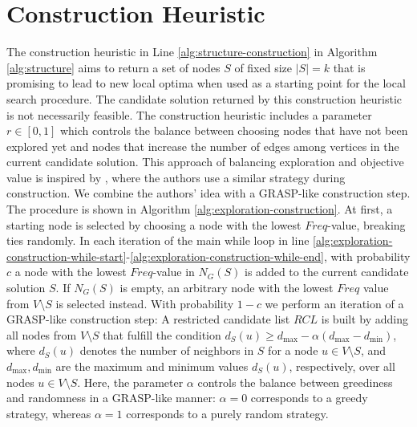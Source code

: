 \documentclass[draft,final]{vutinfth} %
\begin{document}
\section{Construction Heuristic}\label{sec:construction-heuristic}

The construction heuristic in Line \ref{alg:structure-construction} in Algorithm \ref{alg:structure} aims to return a set of nodes $S$ of fixed size $|S| = k$ that is promising to lead to new local optima when used as a starting point for the local search procedure. The candidate solution returned by this construction heuristic is not necessarily feasible. 
The construction heuristic includes a parameter $r \in [0,1]$ which controls the balance between choosing nodes that have not been explored yet and nodes that increase the number of edges among vertices in the current candidate solution. This approach of balancing exploration and objective value is inspired by \cite{chen_nuqclq_2021}, where the authors use a similar strategy during construction. We combine the authors' idea with a GRASP-like construction step. The procedure is shown in Algorithm \ref{alg:exploration-construction}. 
At first, a starting node is selected by choosing a node with the lowest $\mathit{Freq}$-value, breaking ties randomly. In each iteration of the main while loop in line \ref{alg:exploration-construction-while-start}-\ref{alg:exploration-construction-while-end}, with probability $c$ a node with the lowest $\mathit{Freq}$-value in $N_G(S)$ is added to the current candidate solution $S$. If $N_G(S)$ is empty, an arbitrary node with the lowest $\mathit{Freq}$ value from $V\setminus S$ is selected instead. 
With probability $1-c$ we perform an iteration of a GRASP-like construction step: A restricted candidate list $\mathit{RCL}$ is built by adding all nodes from $V \setminus S$ that fulfill the condition $d_S(u) \geq d_{\max} - \alpha(d_{\max} - d_{\min})$, where $d_S(u)$ denotes the number of neighbors in $S$ for a node $u \in V \setminus S$, and $d_{\max}, d_{\min}$ are the maximum and minimum values $d_S(u)$, respectively, over all nodes $u\in V \setminus S$. Here, the parameter $\alpha$ controls the balance between greediness and randomness in a GRASP-like manner: $\alpha=0$ corresponds to a greedy strategy, whereas $\alpha=1$ corresponds to a purely random strategy.  
\end{document}
